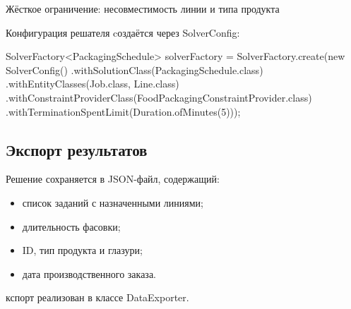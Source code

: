 Жёсткое ограничение: несовместимость линии и типа продукта \

Конфигурация решателя cоздаётся через SolverConfig: \

SolverFactory<PackagingSchedule> solverFactory = SolverFactory.create(new SolverConfig()
    .withSolutionClass(PackagingSchedule.class)
    .withEntityClasses(Job.class, Line.class)
    .withConstraintProviderClass(FoodPackagingConstraintProvider.class)
    .withTerminationSpentLimit(Duration.ofMinutes(5)));

\subsection{Экспорт результатов}

Решение сохраняется в JSON-файл, содержащий:

\begin{itemize}
    \item список заданий с назначенными линиями;
    \item длительность фасовки;
    \item ID, тип продукта и глазури;
    \item дата производственного заказа.
\end{itemize}

кспорт реализован в классе DataExporter.